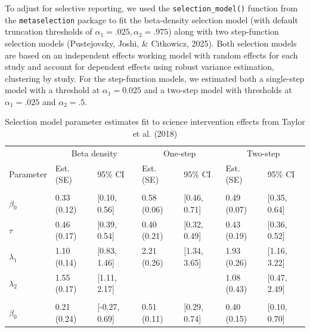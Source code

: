 \documentclass[
  man, donotrepeattitle,floatsintext]{apa7}
\begin{document}
To adjust for selective reporting, we used the \texttt{selection\_model()} function from the \texttt{metaselection} package to fit the beta-density selection model (with default truncation thresholds of \(\alpha_1 = .025, \alpha_2 = .975\)) along with two step-function selection models (Pustejovsky, Joshi, \& Citkowicz, 2025). Both selection models are based on an independent effects working model with random effects for each study and account for dependent effects using robust variance estimation, clustering by study. For the step-function models, we estimated both a single-step model with a threshold at \(\alpha_1 = 0.025\) and a two-step model with thresholds at \(\alpha_1 = .025\) and \(\alpha_2 = .5\).

\begin{table}
\centering
\caption{\label{tab:science-learning-res}Selection model parameter estimates fit to science intervention effects from Taylor et al. (2018)}
\centering
\begin{tabular}[t]{lllllll}
\toprule
\multicolumn{1}{c}{ } & \multicolumn{2}{c}{Beta density} & \multicolumn{2}{c}{One-step} & \multicolumn{2}{c}{Two-step} \\
\cmidrule(l{3pt}r{3pt}){2-3} \cmidrule(l{3pt}r{3pt}){4-5} \cmidrule(l{3pt}r{3pt}){6-7}
Parameter & Est. (SE) & 95\% CI & Est. (SE) & 95\% CI & Est. (SE) & 95\% CI\\
\midrule
\addlinespace[0.3em]
\multicolumn{7}{l}{\textbf{Summary meta-analysis}}\\
\hspace{1em}$\beta_0$ & 0.33 (0.12) & {}[0.10, 0.56] & 0.58 (0.06) & {}[0.46, 0.71] & 0.49 (0.07) & {}[0.35, 0.64]\\
\hspace{1em}$\tau$ & 0.46 (0.17) & {}[0.39, 0.54] & 0.40 (0.21) & {}[0.32, 0.49] & 0.43 (0.19) & {}[0.36, 0.52]\\
\hspace{1em}$\lambda_1$ & 1.10 (0.14) & {}[0.83, 1.46] & 2.21 (0.26) & {}[1.34, 3.65] & 1.93 (0.26) & {}[1.16, 3.22]\\
\hspace{1em}$\lambda_2$ & 1.55 (0.17) & {}[1.11, 2.17] &  &  & 1.08 (0.43) & {}[0.47, 2.49]\\
\addlinespace[0.3em]
\multicolumn{7}{l}{\textbf{Moderator analysis}}\\
\hspace{1em}$\beta_0$ & 0.21 (0.24) & {}[-0.27, 0.69] & 0.51 (0.11) & {}[0.29, 0.74] & 0.40 (0.15) & {}[0.10, 0.70]\\

\end{tabular}
\end{table}
\end{document}
